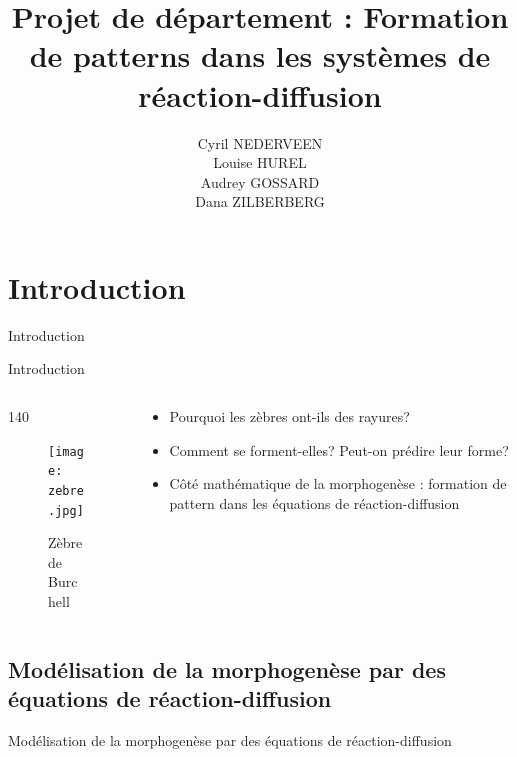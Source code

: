 \documentclass{beamer}
\title[Your Short Title]{Projet de département  : Formation de patterns dans les systèmes de réaction-diffusion}
\author{Cyril NEDERVEEN\\
Louise HUREL\\
Audrey GOSSARD\\
Dana ZILBERBERG}
\institute{Ecole des Ponts Paristech}
\begin{document}
\begin{frame}
  \titlepage
\end{frame}


\section{Introduction}

\begin{frame}{Introduction}

\begin{frame}{Introduction}
    \begin{columns}

    \begin{column}{140}
    \begin{figure}
    \texttt{[image: zebre.jpg]}
    \caption{Zèbre de Burchell}
    \end{figure}
    \end{column}
    
    \begin{column}{5cm}
    \begin{itemize}
      \item Pourquoi les zèbres ont-ils des rayures?
      \item Comment se forment-elles? Peut-on prédire leur forme?
      \item Côté mathématique de la morphogenèse : formation de pattern dans les équations de réaction-diffusion
    \end{itemize}

    
    \end{column}
    \end{columns}
   


\end{frame}



\subsection{Modélisation de la morphogenèse par des équations de réaction-diffusion}

\begin{frame}{Modélisation de la morphogenèse par des équations de réaction-diffusion}


\end{frame}
\end{frame}
\end{document}
